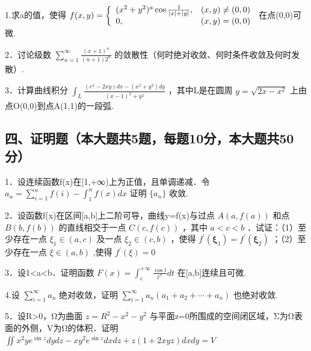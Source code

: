 \documentclass[11pt,fontset=fandol]{ctexart}
\begin{document}
1.求a的值，使得
\(f ( x , y ) = \left\{ \begin{array} { l l } { { ( x ^ { 2 } + y ^ { 2 } ) ^ { a } \cos \frac { 1 } { \left| x \right| + \left| y \right| } , } } & { { ( x , y ) \neq ( 0 , 0 ) } } \\ { { 0 , } } & { { ( x , y ) = ( 0 , 0 ) } } \end{array} \right.\)
在点(0,0)可微.

2．讨论级数
\(\sum _ { n = 1 } ^ { \infty } { \frac { ( x + 1 ) ^ { n } } { ( n + 1 ) 2 ^ { n } } }\)
的敛散性（何时绝对收敛、何时条件收敛及何时发散）.

3．计算曲线积分
\(\int _ { L } { \frac { ( e ^ { x } - 2 x y ) d x - ( x ^ { 2 } + y ^ { 2 } ) d y } { ( x - 1 ) ^ { 2 } + y ^ { 2 } } }\)
，其中L是在圆周 \(y = \sqrt { 2 x - x ^ { 2 } }\)
上由点O(0,0)到点A(1,1)的一段弧.

\subsection{四、证明题（本大题共5题，每题10分，本大题共50分）}\label{ux56dbux8bc1ux660eux9898ux672cux5927ux9898ux51715ux9898ux6bcfux989810ux5206ux672cux5927ux9898ux517150ux5206}

1．设连续函数f(x)在{[}1,+∞)上为正值，且单调递减．令
\(a _ { n } = \sum _ { i = 1 } ^ { n } f ( i ) - \int _ { 1 } ^ { n } f ( x ) d x\)
证明 \(\{ a _ { n } \}\) 收敛.

2．设函数f(x)在区间{[}a,b{]}上二阶可导，曲线y=f(x)与过点
\(A ( a , f ( a ) )\) 和点\(B ( b , f ( b ) )\) 的直线相交于一点
\(C ( c , f ( c ) )\) ，其中 \(a < c < b\) ．试证：（1）至少存在一点
\(\xi _ { 1 } \in ( a , c )\) 及一点 \(\xi _ { 2 } \in ( c , b )\)
，使得
\(f ^ { \prime } ( { \boldsymbol { \xi } } _ { 1 } ) = f ^ { \prime } ( { \boldsymbol { \xi } } _ { 2 } )\)
；（2）至少存在一点 \(\xi \in ( a , b )\) ,使得
\(f ^ { \prime } ( \xi ) = 0\)

3．设1\textless a\textless b．证明函数
\(F ( x ) = \int _ { e } ^ { + \infty } { \frac { \cos t } { t ^ { x } } } d t\)
在{[}a,b{]}连续且可微.

4.设 \(\sum _ { i = 1 } ^ { \infty } a _ { n }\) 绝对收敛，证明
\(\sum _ { i = 1 } ^ { \infty } a _ { n } ( a _ { 1 } + a _ { 2 } + \cdots + a _ { n } )\)
也绝对收敛.

5．设R\textgreater0，Ω为曲面 \(z = R ^ { 2 } - x ^ { 2 } - y ^ { 2 }\)
与平面z=0所围成的空间闭区域，Σ为Ω表面的外侧，V为Ω的体积．证明
\(\iint x ^ { 2 } y e ^ { \sin z } d y d z - x y ^ { 2 } e ^ { \sin z } d x d z + z ( 1 + 2 x y z ) d x d y = V\)
\end{document}
